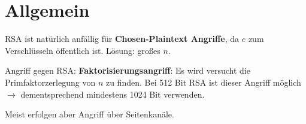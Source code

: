 \section{Allgemein}
RSA ist natürlich anfällig für \textbf{Chosen-Plaintext Angriffe}, da $e$ zum Verschlüsseln öffentlich ist. Lösung: großes $n$.

Angriff gegen RSA: \textbf{Faktorisierungsangriff}: Es wird versucht die Primfaktorzerlegung von $n$ zu finden. Bei 512 Bit RSA ist dieser Angriff möglich $\rightarrow$ dementsprechend mindestens 1024 Bit verwenden. 

Meist erfolgen aber Angriff über Seitenkanäle.





